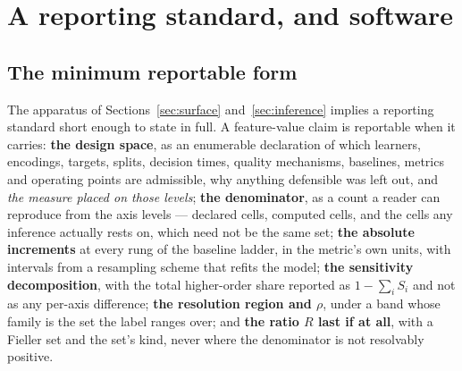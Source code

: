 
\section{A reporting standard, and software}
\label{sec:standard}

\subsection{The minimum reportable form}

The apparatus of Sections~\ref{sec:surface} and~\ref{sec:inference} implies a
reporting standard short enough to state in full. A feature-value claim is
reportable when it carries: \textbf{the design space}, as an enumerable
declaration of which learners, encodings, targets, splits, decision times,
quality mechanisms, baselines, metrics and operating points are admissible,
why anything defensible was left out, and \emph{the measure placed on those
levels}; \textbf{the denominator}, as a count a reader can reproduce from the
axis levels --- declared cells, computed cells, and the cells any inference
actually rests on, which need not be the same set; \textbf{the absolute
increments} at every rung of the baseline ladder, in the metric's own units,
with intervals from a resampling scheme that refits the model; \textbf{the
sensitivity decomposition}, with the total higher-order share reported as
$1 - \sum_i S_i$ and not as any per-axis difference; \textbf{the resolution
region and $\rho$}, under a band whose family is the set the label ranges
over; and \textbf{the ratio $R$ last if at all}, with a Fieller set and the
set's kind, never where the denominator is not resolvably positive.

